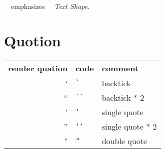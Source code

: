 \documentclass[a4paper,12pt]{article}
\begin{document}
\ \ emphasizes \quad \ \ \emph{Text Shape.}

\section*{Quotion}

\begin{tabular}{r|l|l}
    render quation & code & comment\\  
    \hline
    `  & \verb|`|  &  backtick \\  
    `` & \verb|``| & backtick * 2 \\
    '  & \verb|'|  &  single quote \\
    '' & \verb|''| & single quote * 2 \\
    "  & \verb|"|  &  double quote \\
\end{tabular} \\
\end{document}
